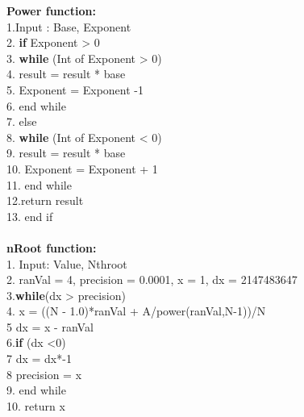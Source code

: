 \documentclass[10pt]{article}
\begin{document}
 \textbf{Power function:}\\
 1.Input : Base, Exponent\\
 2. \quad \textbf{if} Exponent > 0\\
 3.   \quad \quad \textbf{while} (Int of Exponent > 0)\\
 4.       \quad\quad\quad  result = result * base\\
 5. 		\quad\quad\quad Exponent = Exponent -1\\
 6.    \quad \quad end while\\
 7. \quad else\\
 8. 	\quad \quad  \textbf{while} (Int of Exponent < 0)\\
 9.     \quad \quad \quad result = result * base\\
 10. 	\quad \quad \quad Exponent = Exponent + 1\\
 11.  \quad \quad  end while\\
 12.\quad \quad return result\\
 13. \quad end if
  \\
  \\
 \textbf{nRoot function:}\\
 1. \quad Input: Value, Nthroot\\
 2. \quad ranVal = 4, precision = 0.0001, x = 1, dx = 2147483647\\
 3.\quad \textbf{while}(dx > precision)\\
 4. \quad \quad    x = ((N - 1.0)*ranVal + A/power(ranVal,N-1))/N\\
 5 	\quad \quad dx = x - ranVal\\
 6.\quad \quad	\textbf{if} (dx <0)\\
 7 	  \quad \quad \quad   dx = dx*-1\\
 8 \quad \quad 	precision = x\\
 9. \quad end while\\
 10. \quad return x\\
 



\nocite{Manushree:2019}\\

\nocite{Manushree1:2019}

\nocite{Manushree2:2019}

\nocite{Manushree3:2019}

\nocite{Manushree4:2019}

\nocite{Manushree5:2019}

\nocite{Manushree6:2019}

\nocite{Manushree7:2019}

\nocite{Manushree8:2019}

\nocite{Manushree9:2019}

\end{document}
